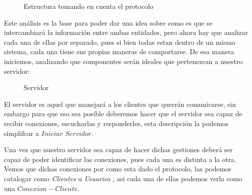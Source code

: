 \documentclass[10pt,letterpaper]{report}
\begin{document}
\vspace{0.5cm}
\begin{figure}[H]
\centering


\caption{Estructura tomando en cuenta el protocolo}
\label{fig:protocolo-chat}
\end{figure}

\vspace{0.5cm}

\noindent Este análisis es la base para poder dar una idea sobre como es que se intercambiará la información entre ambas entidades, pero ahora hay que analizar cada una de ellas por separado, pues si bien todas estan dentro de un mismo sistema, cada una tiene sus propias maneras de comportarse.
\noindent De esa manera iniciemos, analizando que componentes serán ideales que pertenezcan a nuestro servidor:

\vspace{0.5cm}
\begin{figure}[H]
\centering


\caption{Servidor}
\label{fig:servidor}
\end{figure}

\vspace{0.5cm}

\noindent El servidor es aquel que manejará a los clientes que querrán comunicarse, sin embargo para que eso sea posible deberemos hacer que el servidor sea capaz de recibir conexiones, escucharlas y responderles, esta descripción la podemos simplifcar a $Iniciar$ $Servidor$.

\vspace{0.2cm}

\noindent Una vez que nuestro servidor sea capaz de hacer dichas gestiones deberá ser capaz de poder identificar las conexiones, pues cada una es distinta a la otra. Vemos que dichas conexiones por como esta dado el protocolo, las podemos catalogar como \textit{Clientes} u \textit{Usuarios} , asi cada una de ellas  podemos verla como una $Conexion-Cliente$.
\end{document}
